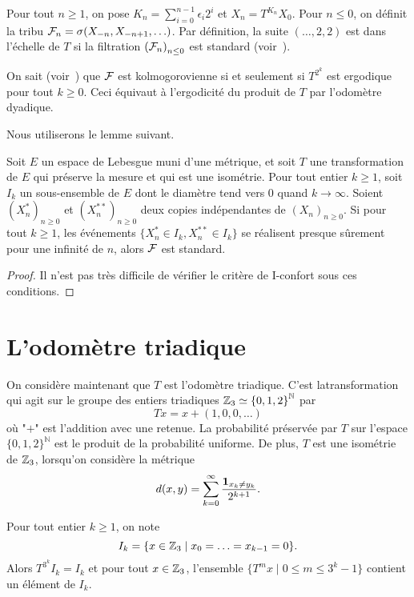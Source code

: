\documentclass[12pt,a4paper]{article}
\begin{document}
Pour tout $n \geq 1$, on pose $K_n = \sum_{i=0}^{n-1} \epsilon_i2^{i}$ 
et $X_n = T^{K_n}X_0$. 
Pour $n \leq 0$, on définit la tribu $\mathcal{F}_n = \sigma(X_{-n}, X_{-n+1}, \ldots)$. 
Par définition, la suite $(\ldots, 2, 2)$ est dans l'échelle 
de $T$ si la filtration ${(\mathcal{F}_n)}_{n \leq 0}$ 
est standard (voir~\cite{LauXLV}). 

On sait (voir~\cite{LauXLV}) que $\mathcal{F}$ est kolmogorovienne si et seulement si 
$T^{2^k}$ est ergodique pour tout $k \geq 0$.
Ceci équivaut à l'ergodicité du produit de $T$ par l'odomètre dyadique. 


Nous utiliserons le lemme suivant.

\begin{lemme}\label{lemm:cosy}
Soit $E$ un espace de Lebesgue muni d'une métrique, et soit $T$ une transformation 
de $E$ qui préserve la mesure et qui est une isométrie. 
Pour tout entier $k \geq 1$, soit $I_k$ un sous-ensemble de $E$ dont le diamètre 
tend vers $0$ quand $k \to \infty$. 
Soient ${(X^\ast_n)}_{n \geq 0}$ et ${(X^{\ast\ast}_n)}_{n \geq 0}$ deux copies indépendantes 
de ${(X_n)}_{n \geq 0}$. 
Si pour tout $k \geq 1$, les événements $\{X^\ast_n \in I_k, X^{\ast\ast}_n \in I_k\}$ 
se réalisent presque sûrement pour une infinité de $n$, alors $\mathcal{F}$ est standard. 
\end{lemme}

\begin{proof}
Il n'est pas très difficile de vérifier le critère de I-confort sous ces conditions.
\end{proof}



\section{L'odomètre triadique}

On considère maintenant que $T$ est l'odomètre triadique. 
C'est latransformation qui agit sur le groupe des entiers triadiques 
$\mathbb{Z}_3 \simeq {\{0,1,2\}}^\mathbb{N}$ par
$$
T x = x + (1, 0, 0, \ldots)
$$
où "$+$" est l'addition avec une retenue. 
La probabilité préservée par $T$ sur l'espace ${\{0,1,2\}}^\mathbb{N}$ est 
le produit de la probabilité uniforme. 
De plus, $T$ est une isométrie de $\mathbb{Z}_3$, lorsqu'on considère la métrique
$$
d(x,y) = \sum_{k=0}^\infty \frac{\boldsymbol 1_{x_k \neq y_k}}{2^{k+1}}.
$$

\begin{lemme}\label{lemme:Ik}
Pour tout entier $k \geq 1$, on note
$$
I_k = \{x \in \mathbb{Z}_3 \mid x_0=\ldots=x_{k-1}=0\}.
$$
Alors $T^{3^k}I_k=I_k$ et pour tout $x \in \mathbb{Z}_3$, 
l'ensemble $\{T^m x \mid 0 \leq m \leq 3^k-1\}$  
contient un élément de $I_k$.
\end{lemme}
\end{document}
